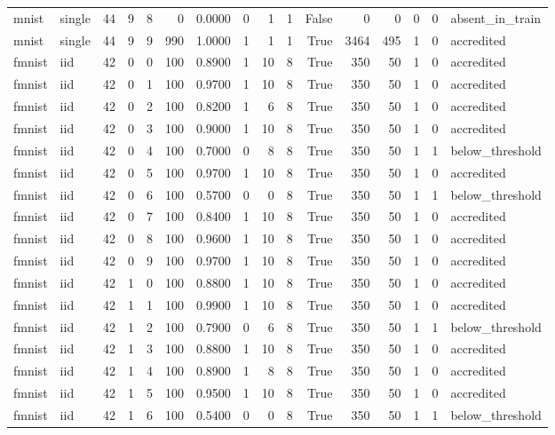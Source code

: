\begin{tabular}{llrrrrrrrrrrrrrl}
mnist & single & 44 & 9 & 8 & 0 & 0.0000 & 0 & 1 & 1 & False & 0 & 0 & 0 & 0 & absent\_in\_train \\
mnist & single & 44 & 9 & 9 & 990 & 1.0000 & 1 & 1 & 1 & True & 3464 & 495 & 1 & 0 & accredited \\
fmnist & iid & 42 & 0 & 0 & 100 & 0.8900 & 1 & 10 & 8 & True & 350 & 50 & 1 & 0 & accredited \\
fmnist & iid & 42 & 0 & 1 & 100 & 0.9700 & 1 & 10 & 8 & True & 350 & 50 & 1 & 0 & accredited \\
fmnist & iid & 42 & 0 & 2 & 100 & 0.8200 & 1 & 6 & 8 & True & 350 & 50 & 1 & 0 & accredited \\
fmnist & iid & 42 & 0 & 3 & 100 & 0.9000 & 1 & 10 & 8 & True & 350 & 50 & 1 & 0 & accredited \\
fmnist & iid & 42 & 0 & 4 & 100 & 0.7000 & 0 & 8 & 8 & True & 350 & 50 & 1 & 1 & below\_threshold \\
fmnist & iid & 42 & 0 & 5 & 100 & 0.9700 & 1 & 10 & 8 & True & 350 & 50 & 1 & 0 & accredited \\
fmnist & iid & 42 & 0 & 6 & 100 & 0.5700 & 0 & 0 & 8 & True & 350 & 50 & 1 & 1 & below\_threshold \\
fmnist & iid & 42 & 0 & 7 & 100 & 0.8400 & 1 & 10 & 8 & True & 350 & 50 & 1 & 0 & accredited \\
fmnist & iid & 42 & 0 & 8 & 100 & 0.9600 & 1 & 10 & 8 & True & 350 & 50 & 1 & 0 & accredited \\
fmnist & iid & 42 & 0 & 9 & 100 & 0.9700 & 1 & 10 & 8 & True & 350 & 50 & 1 & 0 & accredited \\
fmnist & iid & 42 & 1 & 0 & 100 & 0.8800 & 1 & 10 & 8 & True & 350 & 50 & 1 & 0 & accredited \\
fmnist & iid & 42 & 1 & 1 & 100 & 0.9900 & 1 & 10 & 8 & True & 350 & 50 & 1 & 0 & accredited \\
fmnist & iid & 42 & 1 & 2 & 100 & 0.7900 & 0 & 6 & 8 & True & 350 & 50 & 1 & 1 & below\_threshold \\
fmnist & iid & 42 & 1 & 3 & 100 & 0.8800 & 1 & 10 & 8 & True & 350 & 50 & 1 & 0 & accredited \\
fmnist & iid & 42 & 1 & 4 & 100 & 0.8900 & 1 & 8 & 8 & True & 350 & 50 & 1 & 0 & accredited \\
fmnist & iid & 42 & 1 & 5 & 100 & 0.9500 & 1 & 10 & 8 & True & 350 & 50 & 1 & 0 & accredited \\
fmnist & iid & 42 & 1 & 6 & 100 & 0.5400 & 0 & 0 & 8 & True & 350 & 50 & 1 & 1 & below\_threshold \\

\end{tabular}
